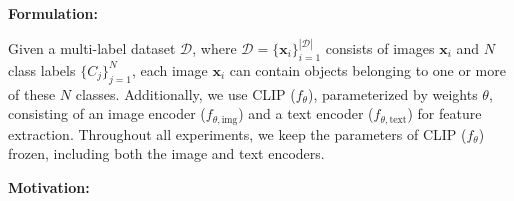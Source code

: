 
\textbf{Formulation:}

Given a multi-label dataset \(\mathcal{D}\), where \(\mathcal{D} = \{\mathbf{x}_i\}_{i=1}^{|\mathcal{D}|}\) consists of images \(\mathbf{x}_i\) and \(N\) class labels \(\{C_j\}_{j=1}^N\), each image \(\mathbf{x}_i\) can contain objects belonging to one or more of these \(N\) classes. Additionally, we use CLIP (\( f_\theta \)), parameterized by weights \(\theta\), consisting of an image encoder (\(f_{\theta,\text{img}}\)) and a text encoder (\(f_{\theta,\text{text}}\)) for feature extraction. Throughout all experiments, we keep the parameters of CLIP (\( f_\theta \)) frozen, including both the image and text encoders.

\textbf{Motivation:}

